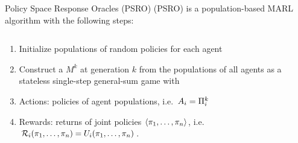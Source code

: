 \begin{frame}[t]{Policy Space Response Oracles (PSRO)}
     (PSRO) is a population-based MARL algorithm with the following steps:

    \vspace{1em}

    \begin{columns}
        \begin{column}{0.65\textwidth}
            \begin{enumerate}
                \item<2-> Initialize populations of random policies for each agent
                \item<3-> Construct a  $M^k$ at generation $k$ from the populations of all agents as a stateless single-step general-sum game with
                    \blist
                        \item Actions: policies of agent populations, i.e.\ $A_i = \Pi_i^k$
                        \item Rewards: returns of joint policies $\langle \pi_1, \ldots, \pi_n \rangle$, i.e.\ $\mathcal{R}_i(\pi_1, \ldots, \pi_n) = U_i(\pi_1, \ldots, \pi_n)$.
                    \elist
            \end{enumerate}
        \end{column}
        \begin{column}{0.3\textwidth}
        \end{column}
    \end{columns}

\end{frame}

